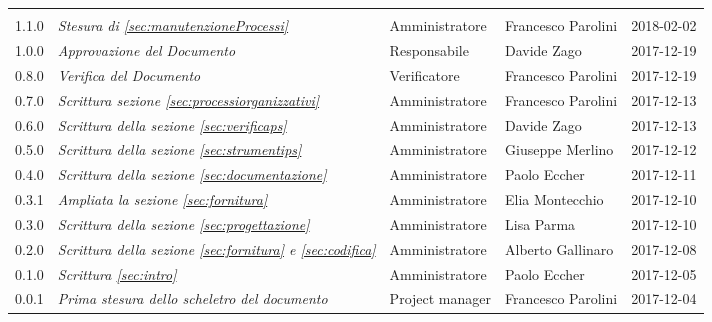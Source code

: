 \newpage 
\section*{}
\begin{table}[H]
	\centering
	\begin{tabular}{p{2cm}|C{4cm}|C{3cm}|R{3cm}|R{2cm}}

		
		
		 &  & &  & \\
		

		1.1.0  & \emph{Stesura di \ref{sec:manutenzioneProcessi}} &  Amministratore & Francesco Parolini & 2018-02-02  \\
		\hline
		
		1.0.0  & \emph{Approvazione del Documento} & Responsabile & Davide Zago &  2017-12-19 \\
		\hline
		
		0.8.0  &  \emph{Verifica del Documento} & Verificatore & Francesco Parolini & 2017-12-19 \\
		\hline
		
		0.7.0  & \emph{Scrittura sezione \ref{sec:processiorganizzativi}}  & Amministratore & Francesco Parolini & 2017-12-13\\
		\hline
		
		0.6.0  & \emph{Scrittura della sezione \ref{sec:verificaps}} &  Amministratore & Davide Zago  & 2017-12-13 \\
		\hline
		
		0.5.0  & \emph{Scrittura della sezione \ref{sec:strumentips}} & Amministratore & Giuseppe Merlino & 2017-12-12\\
		\hline
		
	   	0.4.0  &\emph{Scrittura della sezione \ref{sec:documentazione}}& Amministratore & Paolo Eccher  & 2017-12-11 \\
		\hline
		
		 0.3.1 & \emph{Ampliata la sezione \ref{sec:fornitura}}& Amministratore & Elia Montecchio & 2017-12-10 \\
		\hline
		
		0.3.0 & \emph{Scrittura della sezione \ref{sec:progettazione}} & Amministratore & Lisa Parma & 2017-12-10 \\
		\hline
					
		0.2.0 & \emph{Scrittura della sezione \ref{sec:fornitura} e \ref{sec:codifica}} & Amministratore & Alberto Gallinaro & 2017-12-08 \\
		\hline
		
		0.1.0 & \emph{Scrittura \ref{sec:intro}} & Amministratore & Paolo Eccher & 2017-12-05 \\
		\hline
		
		0.0.1 &\emph{Prima stesura dello scheletro del documento} &  Project manager & Francesco Parolini & 2017-12-04 \\
	

	\end{tabular}
	
\end{table}


\clearpage